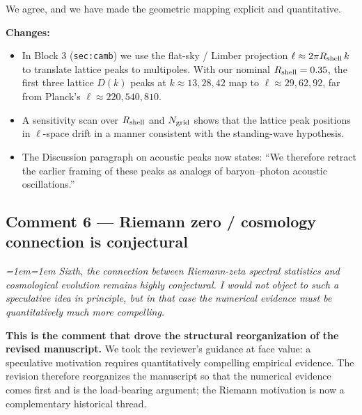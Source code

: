 \documentclass[12pt,a4paper]{article}
\newenvironment{review}{\par\color{revcolor}\itshape\leftskip=1em\rightskip=1em\noindent}{\par}
\begin{document}
We agree, and we have made the geometric mapping explicit and quantitative.

\textbf{Changes:}
\begin{itemize}[leftmargin=2em]
  \item In Block 3 (\texttt{sec:camb}) we use the flat-sky / Limber projection $\ell \approx 2\pi R_{\rm shell}\,k$ to translate lattice peaks to multipoles.
    With our nominal $R_{\rm shell} = 0.35$, the first three lattice $D(k)$ peaks at $k \approx 13, 28, 42$ map to $\ell \approx 29, 62, 92$, far from Planck's $\ell \approx 220, 540, 810$.
  \item A sensitivity scan over $R_{\rm shell}$ and $N_{\rm grid}$ shows that the lattice peak positions in $\ell$-space drift in a manner consistent with the standing-wave hypothesis.
  \item The Discussion paragraph on acoustic peaks now states: ``We therefore retract the earlier framing of these peaks as analogs of baryon--photon acoustic oscillations.''
\end{itemize}

\subsection*{Comment 6 --- Riemann zero / cosmology connection is conjectural}

\begin{review}
\textit{Sixth, the connection between Riemann-zeta spectral statistics and cosmological evolution remains highly conjectural. I would not object to such a speculative idea in principle, but in that case the numerical evidence must be quantitatively much more compelling.}
\end{review}

\textbf{This is the comment that drove the structural reorganization of the revised manuscript.}
We took the reviewer's guidance at face value: a speculative motivation requires quantitatively compelling empirical evidence.
The revision therefore reorganizes the manuscript so that the numerical evidence comes first and is the load-bearing argument; the Riemann motivation is now a complementary historical thread.
\end{document}
